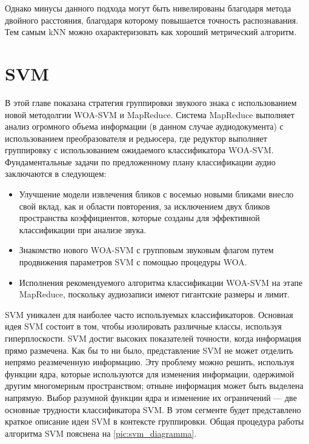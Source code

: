 Однако минусы данного подхода могут быть нивелированы благодаря метода двойного расстояния, 
благодаря которому повышается точность распознавания. Тем самым kNN можно охарактеризовать как
хороший метрический алгоритм.

\section{SVM}

В этой главе показана стратегия группировки звукоого знака с использованием новой методолгии
WOA-SVM и MapReduce. Система MapReduce выполняет анализ огромного объема информации 
(в данном случае аудиодокумента) с использованием преобразователя и редьюсера, 
где редуктор выполняет группировку с использованием ожидаемого классификатора WOA-SVM. 
Фундаментальные задачи по предложенному плану классификации аудио заключаются в следующем:

\begin{itemize}
  \item Улучшение модели извлечения бликов с восемью новыми бликами внесло свой вклад, как и области повторения, за исключением двух бликов пространства коэффициентов, которые созданы для эффективной классификации при анализе звука.
  \item Знакомство нового WOA-SVM с групповым звуковым флагом путем продвижения параметров SVM с помощью процедуры WOA.
  \item Исполнения рекомендуемого алгоритма классификации WOA-SVM на этапе MapReduce, поскольку аудиозаписи имеют гигантские размеры и лимит.
\end{itemize}

SVM \cite{svm} уникален для наиболее часто используемых классификаторов. Основная идея SVM состоит в том, 
чтобы изолировать различные классы, используя гиперплоскости. SVM достиг высоких показателей точности, 
когда информация прямо размечена. Как бы то ни было, представление SVM не может отделить непрямо 
реазмеченную информацию. Эту проблему можно решить, используя функции ядра, которые используются 
для изменения информации, одержимой другим многомерным пространством; отныне информация может быть выделена напрямую.
Выбор разумной функции ядра и изменение их ограничений — две основные трудности классификатора SVM. 
В этом сегменте будет представлено краткое описание идеи SVM в контексте группировки. 
Общая процедура работы алгоритма SVM пояснена на \ref{pic:svm_diagramma}.

